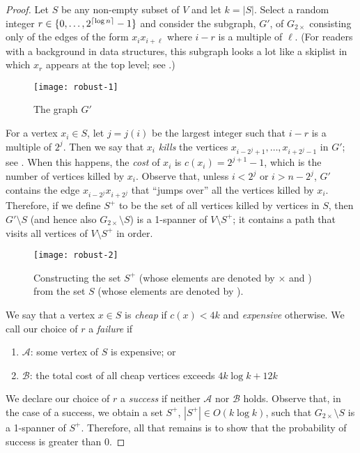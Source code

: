 \documentclass{cccg12}
\begin{document}
\begin{proof}
  Let $S$ be any non-empty subset of $V$ and let $k=|S|$.  Select a
  random integer $r\in\{0,\ldots,2^{{\lceil \log n \rceil}}-1\}$ and consider the
  subgraph, $G'$, of $G_{2\times}$ consisting only of the edges of the
  form $x_ix_{i+\ell}$ where $i-r$ is a multiple of $\ell$.  (For readers
  with a background in data structures, this subgraph looks a lot like a
  skiplist in which $x_r$ appears at the top level; see .)

  \begin{figure*}
    \begin{center}
      \texttt{[image: robust-1]}
    \end{center}
    \caption{The graph $G'$}
  \end{figure*}

  For a vertex $x_i\in S$, let $j=j(i)$ be the largest integer such that
  $i-r$ is a multiple of $2^j$.  Then we say that $x_i$ \emph{kills}
  the vertices $x_{i-2^{j}+1},\ldots,x_{i+2^{j}-1}$ in $G'$; see
  .  When this happens, the \emph{cost} of $x_i$ is
  $c(x_i)=2^{j+1}-1$, which is the number of vertices killed by $x_i$.
  Observe that, unless $i<2^{j}$ or $i>n-2^{j}$, $G'$ contains the
  edge $x_{i-2^{j}}x_{i+2^{j}}$ that ``jumps over'' all the vertices
  killed by $x_i$.  Therefore, if we define $S^+$ to be the set of all
  vertices killed by vertices in $S$, then $G'\setminus S$ (and hence
  also $G_{2\times}\setminus S$) is a 1-spanner of $V\setminus S^+$; it
  contains a path that visits all vertices of $V\setminus S^+$ in order.
  
  \begin{figure*}
    \begin{center}
      \texttt{[image: robust-2]}
    \end{center}
    \caption{Constructing the set $S^+$ (whose elements are denoted
    by $\times$ and \textbullet)
      from the set $S$ (whose elements are denoted by \textbullet).}
  \end{figure*}
  
  We say that a vertex $x\in S$ is \emph{cheap} if $c(x) < 4k$ and
  \emph{expensive} otherwise.  We call our choice of $r$ a \emph{failure}
  if
  \begin{enumerate}
    \item $\mathcal{A}$: some vertex of $S$ is expensive; or
    \item $\mathcal{B}$: the total cost of all cheap vertices exceeds
      $4k\log k+12k$
  \end{enumerate}
  We declare our choice of $r$ a \emph{success} if neither $\mathcal{A}$
  nor $\mathcal{B}$ holds.  Observe that, in the case of a success, we
  obtain a set $S^+$, $|S^+|\in O(k\log k)$, such that $G_{2\times}\setminus
  S$ is a 1-spanner of $S^+$.  Therefore, all that remains is to show that the
  probability of success is greater than 0.
  

\end{proof}
\end{document}
